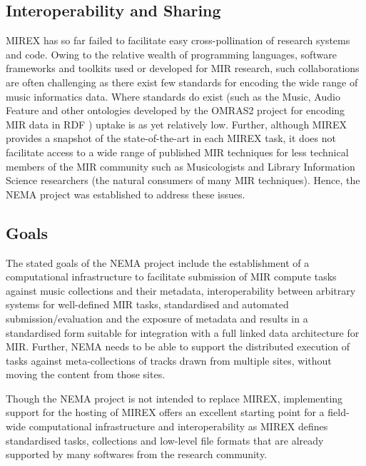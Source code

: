 \documentclass[conference]{IEEEtran}
\begin{document}
\subsection{Interoperability and Sharing}
MIREX has so far failed to facilitate easy cross-pollination of research systems and code. Owing to the relative wealth of programming languages, software frameworks and toolkits used or developed for MIR research, such collaborations are often challenging as there exist few standards for encoding the wide range of music informatics data. Where standards do exist (such as the Music, Audio Feature and other ontologies developed by the OMRAS2 project for encoding MIR data in RDF \cite{raimond2007music}) uptake is as yet relatively low.  
Further, although MIREX provides a snapshot of the state-of-the-art in each MIREX task, it does not facilitate access to a wide range of published MIR techniques for less technical members of the MIR community such as Musicologists and Library Information Science researchers (the natural consumers of many MIR techniques). Hence, the NEMA project was established to address these issues.

\subsection{Goals}
The stated goals of the NEMA project include the establishment of a computational infrastructure to facilitate submission of MIR compute tasks against music collections and their metadata, interoperability between arbitrary systems for well-defined MIR tasks, standardised and automated submission/evaluation and the exposure of metadata and results in a standardised form suitable for integration with a full linked data architecture for MIR. Further, NEMA needs to be able to support the distributed execution of tasks against meta-collections of tracks drawn from multiple sites, without moving the content from those sites.

Though the NEMA project is not intended to replace MIREX, implementing support for the hosting of MIREX offers an excellent starting point for a field-wide computational infrastructure and interoperability as MIREX defines standardised tasks, collections and low-level file formats that are already supported by many softwares from the research community. 
\end{document}
